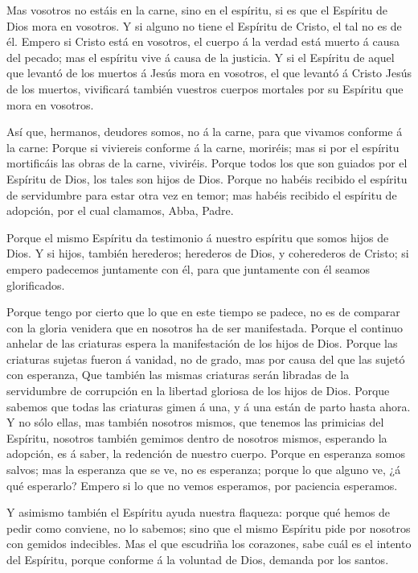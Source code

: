  Mas vosotros no estáis en la carne, sino en el espíritu, si
es que el Espíritu de Dios mora en vosotros. Y si alguno no tiene el
Espíritu de Cristo, el tal no es de él.  Empero si Cristo
está en vosotros, el cuerpo á la verdad está muerto á causa del pecado;
mas el espíritu vive á causa de la justicia.  Y si el
Espíritu de aquel que levantó de los muertos á Jesús mora en vosotros,
el que levantó á Cristo Jesús de los muertos, vivificará también
vuestros cuerpos mortales por su Espíritu que mora en vosotros.

 Así que, hermanos, deudores somos, no á la carne, para que
vivamos conforme á la carne:  Porque si viviereis conforme
á la carne, moriréis; mas si por el espíritu mortificáis las obras de la
carne, viviréis.  Porque todos los que son guiados por el
Espíritu de Dios, los tales son hijos de Dios.  Porque no
habéis recibido el espíritu de servidumbre para estar otra vez en temor;
mas habéis recibido el espíritu de adopción, por el cual clamamos, Abba,
Padre.

 Porque el mismo Espíritu da testimonio á nuestro espíritu
que somos hijos de Dios.  Y si hijos, también herederos;
herederos de Dios, y coherederos de Cristo; si empero padecemos
juntamente con él, para que juntamente con él seamos glorificados.

 Porque tengo por cierto que lo que en este tiempo se
padece, no es de comparar con la gloria venidera que en nosotros ha de
ser manifestada.  Porque el continuo anhelar de las
criaturas espera la manifestación de los hijos de Dios. 
Porque las criaturas sujetas fueron á vanidad, no de grado, mas por
causa del que las sujetó con esperanza,  Que también las
mismas criaturas serán libradas de la servidumbre de corrupción en la
libertad gloriosa de los hijos de Dios.  Porque sabemos que
todas las criaturas gimen á una, y á una están de parto hasta ahora.
 Y no sólo ellas, mas también nosotros mismos, que tenemos
las primicias del Espíritu, nosotros también gemimos dentro de nosotros
mismos, esperando la adopción, es á saber, la redención de nuestro
cuerpo.  Porque en esperanza somos salvos; mas la esperanza
que se ve, no es esperanza; porque lo que alguno ve, ¿á qué esperarlo?
 Empero si lo que no vemos esperamos, por paciencia
esperamos.

 Y asimismo también el Espíritu ayuda nuestra flaqueza:
porque qué hemos de pedir como conviene, no lo sabemos; sino que el
mismo Espíritu pide por nosotros con gemidos indecibles. 
Mas el que escudriña los corazones, sabe cuál es el intento del
Espíritu, porque conforme á la voluntad de Dios, demanda por los santos.

